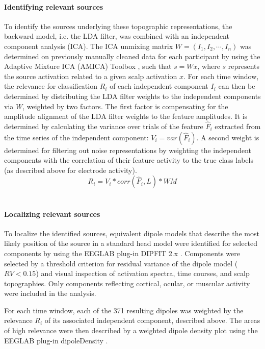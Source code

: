 \paragraph{Identifying relevant sources}
To identify the sources underlying these topographic representations, the backward model, i.e. the LDA filter, was combined with an independent component analysis (ICA). The ICA unmixing matrix $W=(I_1,I_2,\cdots,I_n)$ was determined on previously manually cleaned data for each participant by using the Adaptive Mixture ICA (AMICA) Toolbox \cite{palmer2012amica}, such that $s = Wx$, where $s$ represents the source activation related to a given scalp activation $x$. For each time window, the relevance for classification $R_i$ of each independent component $I_i$ can then be determined by distributing the LDA filter weights to the independent components via $W$, weighted by two factors. The first factor is compensating for the amplitude alignment of the LDA filter weights to the feature amplitudes. It is determined by calculating the variance over trials of the feature $\widehat{F}_i$ extracted from the time series of the independent component: $V_i = var(\widehat{F}_i)$. A second weight is determined for filtering out noise representations by weighting the independent components with the correlation of their feature activity to the true class labels (as described above for electrode activity). $$ R_i = V_i * corr(\widehat{F}_i,L) * W M $$ \\


\paragraph{Localizing relevant sources}
To localize the identified sources, equivalent dipole models that describe the most likely position of the source in a standard head model were identified for selected components by using the EEGLAB plug-in DIPFIT 2.x \cite{oostenveld2003dipfit}. Components were selected by a threshold criterion for residual variance of the dipole model ($RV < 0.15$) and visual inspection of activation spectra, time courses, and scalp topographies. Only components reflecting cortical, ocular, or muscular activity were included in the analysis.

For each time window, each of the 371 resulting dipoles was weighted by the relevance $R_i$ of its associated independent component, described above. The areas of high relevance were then described by a weighted dipole density plot using the EEGLAB plug-in dipoleDensity \cite{miyakoshi2013dipdens}. 

